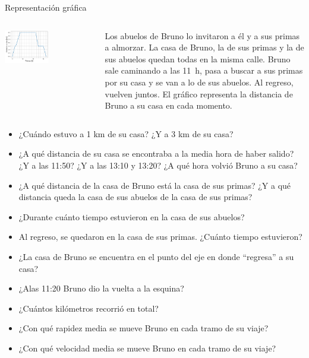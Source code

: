 \documentclass[9pt, aspectratio=169]{beamer}
\begin{document}
\begin{frame}{Representación gráfica}
\begin{columns}
\cx
\begin{center}
    \includegraphics[width=0.5\textwidth]{figs/bruno.pdf}
\end{center}
\cx
{\small
    Los abuelos de Bruno lo invitaron a él y a sus primas a almorzar. La casa de Bruno, la de sus primas y la de sus abuelos quedan todas en la misma calle. Bruno sale caminando a las \qty{11}{h}, pasa a buscar a sus primas por su casa y se van a lo de sus abuelos. Al regreso, vuelven juntos. El gráfico representa la distancia de Bruno a su casa en cada momento.
}
\end{columns}
\begin{multicols}{2}
{ \small
\begin{itemize}
 \item ¿Cuándo estuvo a 1 km de su casa? ¿Y a 3 km de su casa?
 \item ¿A qué distancia de su casa se encontraba a la media hora de haber salido? ¿Y a las 11:50? ¿Y a las 13:10 y 13:20? ¿A qué hora volvió Bruno a su casa?
 \item ¿A qué distancia de la casa de Bruno está la casa de sus primas? ¿Y a qué distancia queda la casa de sus abuelos de la casa de sus primas?
 \item ¿Durante cuánto tiempo estuvieron en la casa de sus abuelos?
 \item Al regreso, se quedaron en la casa de sus primas. ¿Cuánto tiempo estuvieron?
 \item ¿La casa de Bruno se encuentra en el punto del eje en donde “regresa” a su casa?
 \item ¿Alas 11:20 Bruno dio la vuelta a la esquina? 
 \item ¿Cuántos kilómetros recorrió en total?
 \item ¿Con qué rapidez media se mueve Bruno en cada tramo de su viaje?
 \item ¿Con qué velocidad media se mueve Bruno en cada tramo de su viaje?
\end{itemize}
}
\end{multicols}
\end{frame}
\end{document}
